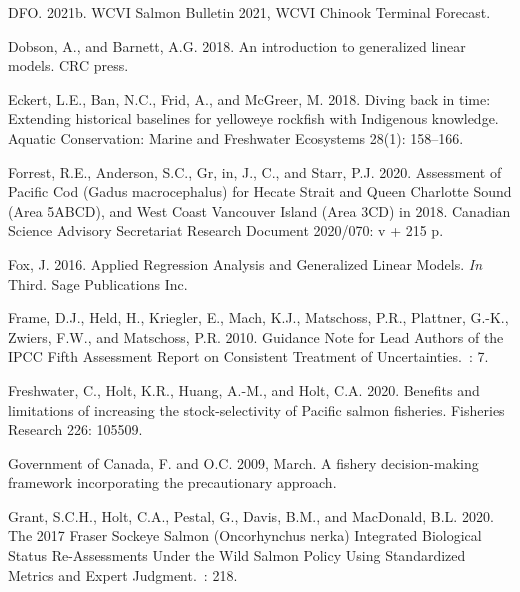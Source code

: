 \documentclass[11pt]{book}
\begin{document}
\begin{CSLReferences}{1}{0}
%
DFO. 2021b. {WCVI} {Salmon} {Bulletin} 2021, {WCVI} {Chinook} {Terminal} {Forecast}.

%
Dobson, A., and Barnett, A.G. 2018. An introduction to generalized linear models. CRC press.

%
Eckert, L.E., Ban, N.C., Frid, A., and McGreer, M. 2018. Diving back in time: {Extending} historical baselines for yelloweye rockfish with {Indigenous} knowledge. Aquatic Conservation: Marine and Freshwater Ecosystems 28(1): 158--166.

%
Forrest, R.E., Anderson, S.C., Gr, in, J., C., and Starr, P.J. 2020. Assessment of {Pacific} {Cod} ({Gadus} macrocephalus) for {Hecate} {Strait} and {Queen} {Charlotte} {Sound} ({Area} {5ABCD}), and {West} {Coast} {Vancouver} {Island} ({Area} {3CD}) in 2018. Canadian Science Advisory Secretariat Research Document 2020/070: v + 215 p.

%
Fox, J. 2016. Applied {Regression} {Analysis} and {Generalized} {Linear} {Models}. \emph{In} Third. Sage Publications Inc.

%
Frame, D.J., Held, H., Kriegler, E., Mach, K.J., Matschoss, P.R., Plattner, G.-K., Zwiers, F.W., and Matschoss, P.R. 2010. Guidance {Note} for {Lead} {Authors} of the {IPCC} {Fifth} {Assessment} {Report} on {Consistent} {Treatment} of {Uncertainties}.~: 7.

%
Freshwater, C., Holt, K.R., Huang, A.-M., and Holt, C.A. 2020. Benefits and limitations of increasing the stock-selectivity of {Pacific} salmon fisheries. Fisheries Research 226: 105509.

%
Government of Canada, F. and O.C. 2009, March. A fishery decision-making framework incorporating the precautionary approach.

%
Grant, S.C.H., Holt, C.A., Pestal, G., Davis, B.M., and MacDonald, B.L. 2020. The 2017 {Fraser} {Sockeye} {Salmon} ({Oncorhynchus} nerka) {Integrated} {Biological} {Status} {Re}-{Assessments} {Under} the {Wild} {Salmon} {Policy} {Using} {Standardized} {Metrics} and {Expert} {Judgment}.~: 218.


\end{CSLReferences}
\end{document}

